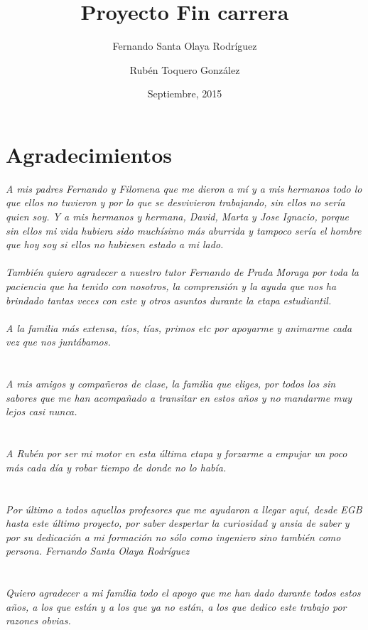 \documentclass[b5paper,10pt,twoside]{book}
\title{Proyecto Fin carrera}
\author{Fernando Santa Olaya Rodríguez \\
	\and 
	Rubén Toquero González}
\date{Septiembre, 2015}
\begin{document}
	\maketitle
	

	\chapter*{Agradecimientos}

	
	\textit{A mis padres Fernando y Filomena que me dieron a mí y a mis hermanos todo lo que ellos no tuvieron y por lo que se desvivieron trabajando, sin ellos no sería quien soy. Y a mis hermanos y hermana, David, Marta y Jose Ignacio, porque sin ellos mi vida hubiera sido muchísimo más aburrida y tampoco sería el hombre que hoy soy si ellos no hubiesen estado a mi lado.\\\\
		También quiero agradecer a nuestro tutor Fernando de Prada Moraga por toda la paciencia que ha tenido con nosotros, la comprensión y la ayuda que nos ha brindado tantas veces con este y otros asuntos durante la etapa estudiantil.\\\\
		A la familia más extensa, tíos, tías, primos etc por apoyarme y animarme cada vez que nos juntábamos.\\\\\\
		A mis amigos y compañeros de clase, la familia que eliges, por todos los sin sabores que me han acompañado a transitar en estos años y no mandarme muy lejos casi nunca.\\\\\\
		A Rubén por ser mi motor en esta última etapa y forzarme a empujar un poco más cada día y robar tiempo de donde no lo había.\\\\\\
		Por último a todos aquellos profesores que me ayudaron a llegar aquí, desde EGB hasta este último proyecto, por saber despertar la curiosidad y ansia de saber y por su dedicación a mi formación no sólo como ingeniero sino también como persona.
		Fernando Santa Olaya Rodríguez\\\\\\
		Quiero agradecer a mi familia todo el apoyo que me han dado durante todos estos años, a los que están y a los que ya no están, a los que dedico este trabajo por razones obvias.\\\\
}
\end{document}
